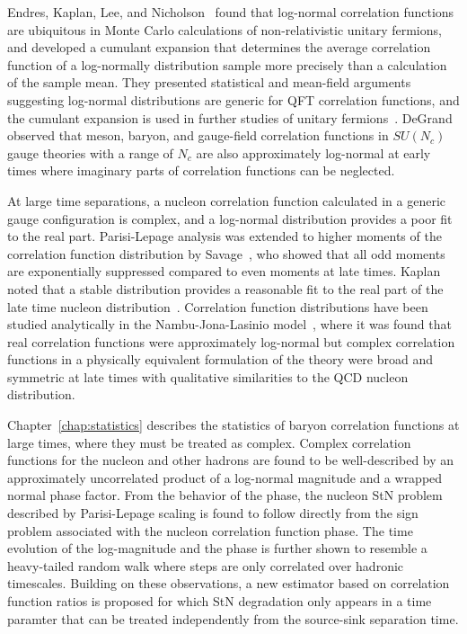 Endres, Kaplan, Lee, and Nicholson~\cite{Endres:2011jm} found that log-normal correlation functions are ubiquitous in Monte Carlo calculations of non-relativistic unitary fermions, and
developed a cumulant expansion that determines the average correlation function of a log-normally distribution sample more precisely than a calculation of the sample mean.
They presented statistical and mean-field arguments suggesting log-normal distributions are generic for QFT correlation functions,
and the cumulant expansion is used in further studies of unitary fermions~\cite{Endres:2011er,Endres:2011mm,Lee:2011sm,Endres:2012cw}.
DeGrand~\cite{DeGrand:2012ik} observed that meson, baryon, and gauge-field correlation functions in 
$SU(N_c)$ gauge theories with a range of $N_c$ are also approximately log-normal at early times where 
imaginary parts of correlation functions can be neglected. 

At large time separations, a nucleon correlation function calculated in a generic gauge configuration is complex,
and a log-normal distribution provides a poor fit to the real part.
Parisi-Lepage analysis was extended to higher moments of the correlation function distribution by Savage~\cite{Savage:2010misc},
who showed that all odd moments are exponentially suppressed compared to even moments at late times.
Kaplan noted that a stable distribution provides a reasonable fit to the real part of the late time nucleon distribution~\cite{davidkaplanLuschertalk}.
Correlation function distributions have been studied analytically in the Nambu-Jona-Lasinio 
model~\cite{Grabowska:2012ik,Nicholson:2012xt}, where it was found that real correlation functions were approximately log-normal but complex correlation functions in a physically equivalent formulation of the theory were broad and symmetric at late times with qualitative similarities to the QCD nucleon distribution. 

Chapter~\ref{chap:statistics} describes the statistics of baryon correlation functions at large times, where they must be treated as complex.
Complex correlation functions for the nucleon and other hadrons are found to be well-described by an approximately uncorrelated product of a log-normal magnitude and a wrapped normal phase factor.
From the behavior of the phase, the nucleon StN problem described by Parisi-Lepage scaling is found to follow directly from the sign problem associated with the nucleon correlation function phase.
The time evolution of the log-magnitude and the phase is further shown to resemble a heavy-tailed random walk where steps are only correlated over hadronic timescales.
Building on these observations, a new estimator based on correlation function ratios is proposed for which StN degradation only appears in a time paramter that can be treated independently from the source-sink separation time.

